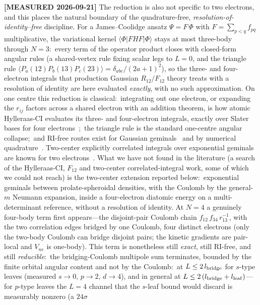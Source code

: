 \documentclass[aps,pra,twocolumn,superscriptaddress,longbibliography]{revtex4-2}
\begin{document}
\textbf{[MEASURED 2026-09-21]} The reduction is also not specific to two
electrons, and this places the natural boundary of the quadrature-free,
\emph{resolution-of-identity--free} discipline.  For a James--Coolidge ansatz
$\Psi = F\,\Phi$ with $F=\sum_{p<q}f_{pq}$ multiplicative, the variational
kernel $\langle\Phi|F H F|\Phi\rangle$ stays at most three-body through
$N=3$:\ every term of the operator product closes with closed-form angular
rules (a shared-vertex rule fixing scalar legs to $L=0$, and the triangle rule
$\langle P_a(12)P_b(13)P_c(23)\rangle = \delta_{abc}/(2a+1)^2$), so the
three- and four-electron integrals that production Gaussian $R_{12}/F_{12}$
theory treats with a resolution of identity are here evaluated \emph{exactly},
with no such approximation.  On one centre this reduction is classical:\
integrating out one electron, or expanding the $r_{ij}$ factors across a shared
electron with an addition theorem, is how atomic Hylleraas-CI evaluates its
three- and four-electron integrals, exactly over Slater bases for four
electrons~\cite{King2014,SimsHagstrom2015,RuizSimsPadhy2021};\ the triangle
rule is the standard one-centre angular collapse;\ and RI-free routes exist for
Gaussian geminals~\cite{BarcaLoos2017} and by numerical
quadrature~\cite{TenNo2004}.  Two-center explicitly correlated integrals over
exponential geminals are known for two
electrons~\cite{LesiukMoszynski2012,Pachucki2012}.  What we have not found in
the literature (a search of the Hylleraas-CI, $F_{12}$ and two-center
correlated-integral work, some of which we could not reach) is the two-center
extension reported below:\ exponential geminals between prolate-spheroidal
densities, with the Coulomb by the general-$m$ Neumann expansion, inside a
four-electron diatomic energy on a multi-determinant reference, without a
resolution of identity.  At $N=4$ a genuinely four-body term first appears---the
disjoint-pair Coulomb chain $f_{12}\,f_{34}\,r_{13}^{-1}$, with the two
correlation edges bridged by one Coulomb, four distinct electrons (only the
two-body Coulomb can bridge disjoint pairs; the kinetic gradients are
pair-local and $V_{ne}$ is one-body).  This term is nonetheless still
\emph{exact}, still RI-free, and still \emph{reducible}:\ the bridging-Coulomb
multipole sum terminates, bounded by the finite orbital angular content and not
by the Coulomb:\ at $L\le 2\,l_{\rm bridge}$ for $s$-type leaves (measured
$s\!\to\!0,\,p\!\to\!2,\,d\!\to\!4$), and in general at
$L\le 2\,(l_{\rm bridge}+l_{\rm leaf})$---for $p$-type leaves the $L=4$ channel
that the $s$-leaf bound would discard is measurably nonzero (a $24\sigma$
\end{document}

